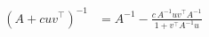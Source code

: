 \begin{align*}
(A + cuv^\top)^{-1} &= A^{-1} - \frac{c\,A^{-1}uv^\top A^{-1}}{1 + v^\top A^{-1}u}
\end{align*}
